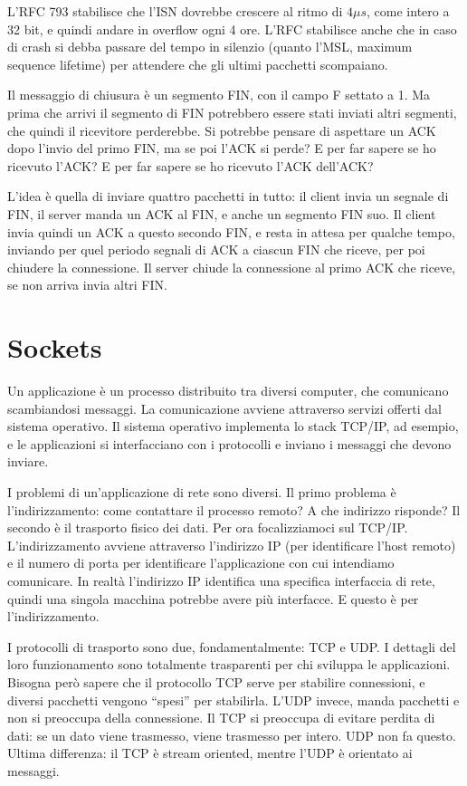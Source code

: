 L'RFC 793 stabilisce che l'ISN dovrebbe crescere al ritmo di $4 \mu s$, come intero a 32 bit, e quindi andare in overflow ogni 4 ore. L'RFC stabilisce anche che in caso di crash si debba passare del tempo in silenzio (quanto l'MSL, maximum sequence lifetime) per attendere che gli ultimi pacchetti scompaiano.

Il messaggio di chiusura \`e un segmento FIN, con il campo F settato a 1. Ma prima che arrivi il segmento di FIN potrebbero essere stati inviati altri segmenti, che quindi il ricevitore perderebbe. Si potrebbe pensare di aspettare un ACK dopo l'invio del primo FIN, ma se poi l'ACK si perde? E per far sapere se ho ricevuto l'ACK? E per far sapere se ho ricevuto l'ACK dell'ACK?

L'idea \`e quella di inviare quattro pacchetti in tutto: il client invia un segnale di FIN, il server manda un ACK al FIN, e anche un segmento FIN suo. Il client invia quindi un ACK a questo secondo FIN, e resta in attesa per qualche tempo, inviando per quel periodo segnali di ACK a ciascun FIN che riceve, per poi chiudere la connessione. Il server chiude la connessione al primo ACK che riceve, se non arriva invia altri FIN.

\section{Sockets}

Un applicazione \`e un processo distribuito tra diversi computer, che comunicano scambiandosi messaggi. La comunicazione avviene attraverso servizi offerti dal sistema operativo. Il sistema operativo implementa lo stack TCP/IP, ad esempio, e le applicazioni si interfacciano con i protocolli e inviano i messaggi che devono inviare.

I problemi di un'applicazione di rete sono diversi. Il primo problema \`e l'indirizzamento: come contattare il processo remoto? A che indirizzo risponde? Il secondo \`e il trasporto fisico dei dati. Per ora focalizziamoci sul TCP/IP. L'indirizzamento avviene attraverso l'indirizzo IP (per identificare l'host remoto) e il numero di porta per identificare l'applicazione con cui intendiamo comunicare. In realt\`a l'indirizzo IP identifica una specifica interfaccia di rete, quindi una singola macchina potrebbe avere pi\`u interfacce. E questo \`e per l'indirizzamento.

I protocolli di trasporto sono due, fondamentalmente: TCP e UDP. I dettagli del loro funzionamento sono totalmente trasparenti per chi sviluppa le applicazioni. Bisogna per\`o sapere che il protocollo TCP serve per stabilire connessioni, e diversi pacchetti vengono ``spesi'' per stabilirla. L'UDP invece, manda pacchetti e non si preoccupa della connessione. Il TCP si preoccupa di evitare perdita di dati: se un dato viene trasmesso, viene trasmesso per intero. UDP non fa questo. Ultima differenza: il TCP \`e stream oriented, mentre l'UDP \`e orientato ai messaggi.

